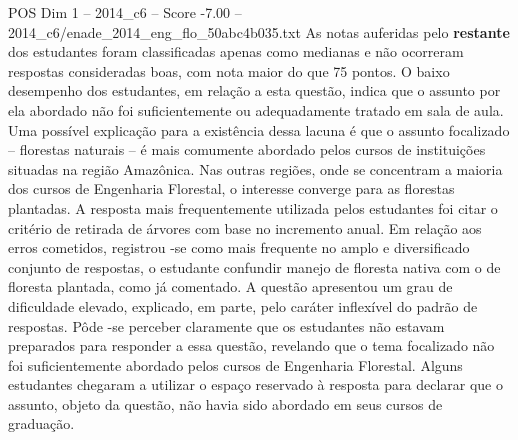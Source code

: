 \begin{textsample}{POS Dim 1 – 2014\_c6 – Score -7.00 – 2014\_c6/enade\_2014\_eng\_flo\_50abc4b035.txt}
As notas auferidas pelo \textbf{restante} dos estudantes foram classificadas apenas como medianas e não ocorreram respostas consideradas boas, com nota maior do que 75 pontos.
O baixo desempenho dos estudantes, em relação a esta questão, indica que o assunto por ela abordado não foi suficientemente ou adequadamente tratado em sala de aula.
Uma possível explicação para a existência dessa lacuna é que o assunto focalizado – florestas naturais – é mais comumente abordado pelos cursos de instituições situadas na região Amazônica.
Nas outras regiões, onde se concentram a maioria dos cursos de Engenharia Florestal, o interesse converge para as florestas plantadas.
A resposta mais frequentemente utilizada pelos estudantes foi citar o critério de retirada de árvores com base no incremento anual.
Em relação aos erros cometidos, registrou -se como mais frequente no amplo e diversificado conjunto de respostas, o estudante confundir manejo de floresta nativa com o de floresta plantada, como já comentado.
A questão apresentou um grau de dificuldade elevado, explicado, em parte, pelo caráter inflexível do padrão de respostas.
Pôde -se perceber claramente que os estudantes não estavam preparados para responder a essa questão, revelando que o tema focalizado não foi suficientemente abordado pelos cursos de Engenharia Florestal.
Alguns estudantes chegaram a utilizar o espaço reservado à resposta para declarar que o assunto, objeto da questão, não havia sido abordado em seus cursos de graduação.

\end{textsample}
